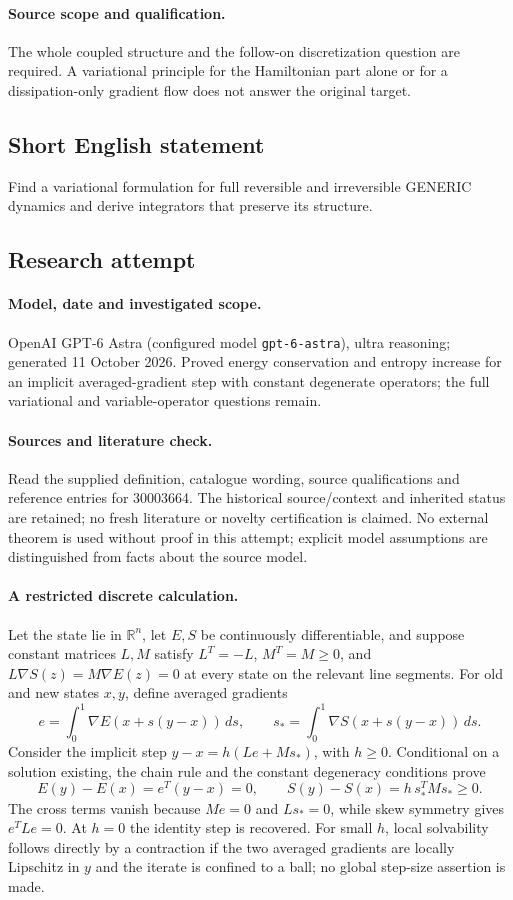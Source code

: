 \documentclass[11pt]{article}
\begin{document}
\paragraph{Source scope and qualification.}
The whole coupled structure and the follow-on discretization question are required. A variational principle for the Hamiltonian part alone or for a dissipation-only gradient flow does not answer the original target.
\subsection{Short English statement}
Find a variational formulation for full reversible and irreversible GENERIC dynamics and derive integrators that preserve its structure.
\subsection{Research attempt}
\paragraph{Model, date and investigated scope.}
OpenAI GPT-6 Astra (configured model \texttt{gpt-6-astra}), ultra reasoning; generated 11 October 2026. Proved energy conservation and entropy increase for an implicit averaged-gradient step with constant degenerate operators; the full variational and variable-operator questions remain.

\paragraph{Sources and literature check.}
Read the supplied definition, catalogue wording, source qualifications and reference entries for 30003664. The historical source/context and inherited status are retained; no fresh literature or novelty certification is claimed. No external theorem is used without proof in this attempt; explicit model assumptions are distinguished from facts about the source model.

\paragraph{A restricted discrete calculation.} Let the state lie in \(\mathbb R^n\), let \(E,S\) be continuously differentiable, and suppose constant matrices \(L,M\) satisfy \(L^T=-L\), \(M^T=M\ge0\), and \(L\nabla S(z)=M\nabla E(z)=0\) at every state on the relevant line segments. For old and new states \(x,y\), define averaged gradients
\[
 e=\int_0^1\nabla E(x+s(y-x))\,ds,\qquad
 s_*=\int_0^1\nabla S(x+s(y-x))\,ds.
\]
Consider the implicit step \(y-x=h(Le+Ms_*)\), with \(h\ge0\). Conditional on a solution existing, the chain rule and the constant degeneracy conditions prove
\[
 E(y)-E(x)=e^T(y-x)=0,\qquad
 S(y)-S(x)=h\,s_*^TMs_*\ge0.
\]
The cross terms vanish because \(Me=0\) and \(Ls_*=0\), while skew symmetry gives \(e^TLe=0\). At \(h=0\) the identity step is recovered. For small \(h\), local solvability follows directly by a contraction if the two averaged gradients are locally Lipschitz in \(y\) and the iterate is confined to a ball; no global step-size assertion is made.
\end{document}
